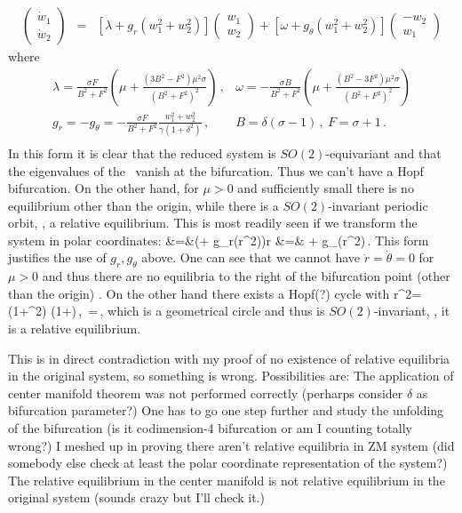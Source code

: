 \begin{eqnarray}
 \left(\begin{array}{c} \dot{w}_1 \\ \dot{w}_2  \end{array}\right) & = & \left[\lambda + g_r(w_1^2+w_2^2) \right]\left(\begin{array}{c} w_1 \\ w_2  \end{array}\right) + \left[\omega + g_\theta(w_1^2+w_2^2) \right] \left(\begin{array}{c} -w_2 \\ w_1 \end{array}\right)
\end{eqnarray}
where
\[\begin{array}{cc}
	\lambda = \frac{ \sigma F}{B^2+F^2} \left(\mu +\frac{\left(3 B^2-F^2\right) \mu ^2 \sigma }{\left(B^2+F^2\right)^2}\right)\,, &
		\omega = -\frac{ \sigma B}{B^2+F^2}\left(\mu +\frac{\left(B^2-3 F^2\right) \mu ^2 \sigma }{\left(B^2+F^2\right)^2}\right) \\
	g_r= -g_\theta= -\frac{ \sigma F}{B^2+F^2} \frac{w_1^2+w_2^2}{\gamma\left(1+\delta ^2\right)}\,,  & B = \delta(\sigma-1)\,,\ F=\sigma+1\,.  \\
\end{array}
\]
In this form it is clear that the reduced system is
$SO(2)$-equivariant and that the eigenvalues of the \stabmat\
vanish at the bifurcation. Thus we can't have a Hopf
bifurcation. On the other hand, for $\mu>0$ and sufficiently
small there is no equilibrium other than the origin, while
there is a $SO(2)$-invariant periodic orbit, \ie, a relative
equilibrium. This is most readily seen if we transform the
system in polar coordinates:
\bea
	 &=&\left(\lambda+ g_r(r^2)\right)r \continue
	\dot{\theta} &=& \omega+ g_\theta(r^2)\,.
\eea
This form justifies the use of $g_r,g_\theta$ above. One can see that we cannot have $\dot{r}=\dot{\theta}=0$ for $\mu>0$ and
thus there are no equilibria to the right of the bifurcation point (other than the origin) . On the other hand there exists a Hopf(?) cycle with
\beq
	r^2= \gamma  \left(1+\delta ^2\right) \mu  \left(1+\right)\,,\ \dot{\theta}=\,,
\eeq
which is a geometrical circle and thus is $SO(2)$-invariant, \ie, it is a relative equilibrium.

This is in direct contradiction with my proof of no existence of relative equilibria in the original system, so something
is wrong. Possibilities are: The application of center manifold theorem was not performed correctly (perharps consider $\delta$
as bifurcation parameter?) One has to go one step further and study the unfolding of the bifurcation (is it codimension-4 bifurcation
or am I counting totally wrong?) I meshed up in proving there aren't relative equilibria in ZM system (did somebody else check at least the polar coordinate representation of the system?) The relative equilibrium in the center manifold is not relative equilibrium in
the original system (sounds crazy but I'll check it.)

